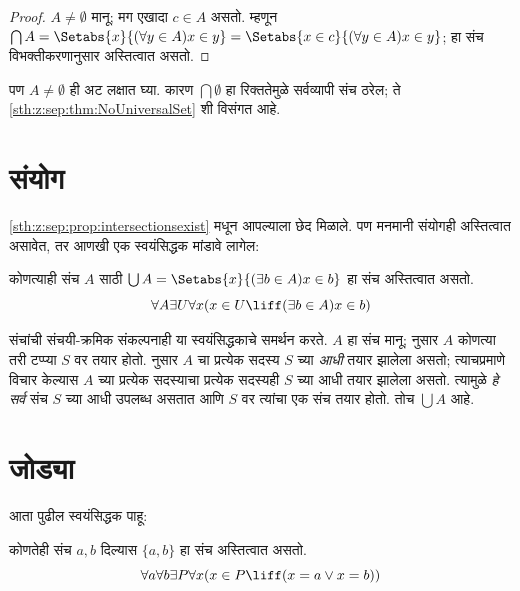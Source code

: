 \begin{proof}
$A \neq \emptyset$ मानू; मग एखादा $c \in A$ असतो. म्हणून $\bigcap A =
\Setabs{x}{(\forall y \in A)x \in y} = \Setabs{x \in c}{(\forall y \in
A)x \in y}$; हा संच विभक्तीकरणानुसार अस्तित्वात असतो.
\end{proof}

पण $A \neq \emptyset$ ही अट लक्षात घ्या. कारण $\bigcap
\emptyset$ हा रिक्ततेमुळे सर्वव्यापी संच ठरेल; ते \ref{sth:z:sep:thm:NoUniversalSet} शी विसंगत आहे.







\section{संयोग}\label{sth:z:union:sec}

\ref{sth:z:sep:prop:intersectionsexist} मधून आपल्याला छेद मिळाले. पण मनमानी संयोगही अस्तित्वात असावेत, तर आणखी एक स्वयंसिद्धक मांडावे लागेल:

\begin{axiom}[संयोग] कोणत्याही संच $A$ साठी $\bigcup A =
\Setabs{x}{(\exists b \in A) x \in b}$ हा संच अस्तित्वात असतो.
\[
	\forall A \exists U \forall x(x \in U \liff (\exists b \in A)x \in b)
\]
\end{axiom}

संचांची संचयी-क्रमिक संकल्पनाही या स्वयंसिद्धकाचे समर्थन करते. $A$ हा संच मानू; \stageshier{} नुसार $A$ कोणत्या तरी टप्प्या $S$ वर तयार होतो. \stagesacc{} नुसार $A$ चा प्रत्येक सदस्य $S$ च्या \emph{आधी} तयार झालेला असतो; त्याचप्रमाणे विचार केल्यास $A$ च्या प्रत्येक सदस्याचा प्रत्येक सदस्यही $S$ च्या आधी तयार झालेला असतो. त्यामुळे \emph{हे सर्व} संच $S$ च्या आधी उपलब्ध असतात आणि $S$ वर त्यांचा एक संच तयार होतो. तोच $\bigcup A$ आहे.







\section{जोड्या}\label{sth:z:pairs:sec}

आता पुढील स्वयंसिद्धक पाहू:

\begin{axiom}[जोड्या]
कोणतेही संच $a, b$ दिल्यास $\{a, b\}$ हा संच अस्तित्वात असतो.
\[
	\forall a \forall b \exists P \forall x (x \in P \liff (x = a \lor x = b))
\]
\end{axiom}

